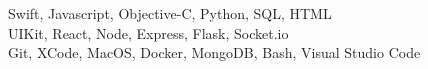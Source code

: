    Swift, Javascript, Objective-C, Python, SQL, HTML \\
   UIKit, React, Node, Express, Flask, Socket.io\\
  Git, XCode, MacOS, Docker, MongoDB, Bash, Visual Studio Code

